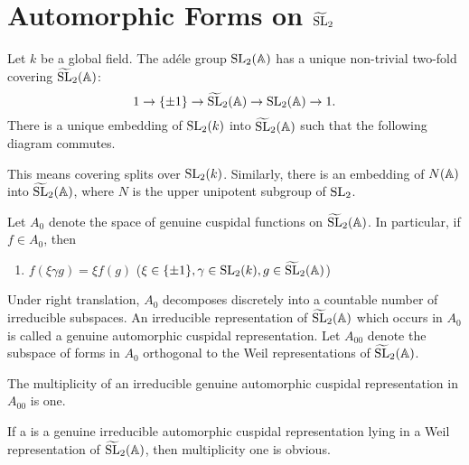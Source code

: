 \section{Automorphic Forms on $\widetilde{\mathrm{SL}}_2$}


Let $k$ be a global field.
The ad\'ele group $\mathrm{SL}_2(\mathbb{A})$ has a unique non-trivial two-fold covering $\widetilde{\mathrm{SL}}_2(\mathbb{A})$:
\[
1 \to \{\pm 1\} \to \widetilde{\mathrm{SL}}_2(\mathbb{A}) \to \mathrm{SL}_2(\mathbb{A}) \to 1.
\]
There is a unique embedding of $\mathrm{SL}_2(k)$ into $\widetilde{\mathrm{SL}}_2(\mathbb{A})$ such that the following diagram commutes.

\begin{center}
\end{center}

This means covering splits over $\mathrm{SL}_2(k)$.
Similarly, there is an embedding of $N(\mathbb{A})$ into $\widetilde{\mathrm{SL}}_2(\mathbb{A})$, where $N$ is the upper unipotent subgroup of $\mathrm{SL}_2$.

Let $A_0$ denote the space of genuine cuspidal functions on $\widetilde{\mathrm{SL}}_2(\mathbb{A})$.
In particular, if $f \in A_0$, then

\begin{enumerate}
    \item $f(\xi \gamma g) = \xi f(g)$ \qquad ($\xi \in \{ \pm 1 \}, \gamma \in \mathrm{SL}_2(k), g \in \widetilde{\mathrm{SL}}_2(\mathbb{A})$)
\end{enumerate}

Under right translation, $A_0$ decomposes discretely into a countable number of irreducible subspaces.
An irreducible representation of $\widetilde{\mathrm{SL}}_2(\mathbb{A})$ which occurs in $A_0$ is called a genuine automorphic cuspidal
representation.
Let $A_{00}$ denote the subspace of forms in $A_0$ orthogonal to the Weil representations of $\widetilde{\mathrm{SL}}_2(\mathbb{A})$.

\begin{theorem}
The multiplicity of an irreducible genuine automorphic cuspidal representation in $A_{00}$ is one.
\end{theorem}
\begin{remark*}
If a is a genuine irreducible automorphic cuspidal representation lying in a Weil representation of $\widetilde{\mathrm{SL}}_2(\mathbb{A})$, then multiplicity one is obvious.
\end{remark*}

